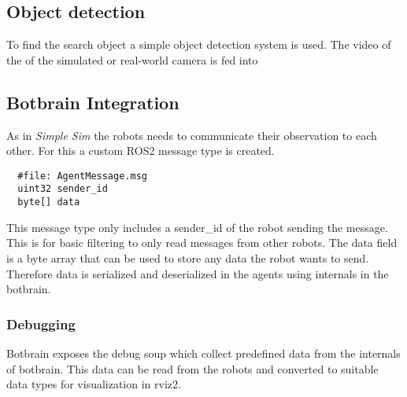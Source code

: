 \subsection{Object detection}\label{sub:object_detection}
To find the search object a simple object detection system is used. The video of the of the simulated or real-world camera is fed into

\subsection{Botbrain Integration}\label{sub:botbrain_integration}
As in \textit{Simple Sim} the robots needs to communicate their observation to each other. For this a custom ROS2 message type is created. 
\begin{verbatim}
  #file: AgentMessage.msg
  uint32 sender_id
  byte[] data
\end{verbatim}
This message type only includes a sender\_id of the robot sending the message. This is for basic filtering to only read messages from other robots.
The data field is a byte array that can be used to store any data the robot wants to send. Therefore data is serialized and deserialized in the agents using internals in the botbrain.

\subsubsection{Debugging}\label{sec:debugging_rviz}
Botbrain exposes the debug soup which collect predefined data from the internals of botbrain. This data can be read from the robots and converted to suitable data types for visualization in rviz2.
